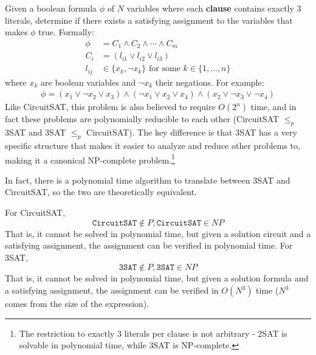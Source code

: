 \documentclass{article}
\begin{document}
    \begin{definition}[3SAT]
      Given a boolean formula $\phi$ of $N$ variables where each \textbf{clause} contains exactly 3 literals, determine if there exists a satisfying assignment to the variables that makes $\phi$ true. Formally:
      \begin{align*}
        \phi &= C_1 \land C_2 \land \cdots \land C_m \\
        C_i &= (l_{i1} \lor l_{i2} \lor l_{i3}) \\
        l_{ij} &\in \{x_k, \neg x_k\} \text{ for some } k \in \{1,\ldots,n\}
      \end{align*}
      where $x_k$ are boolean variables and $\neg x_k$ their negations. For example:
      \begin{align*}
        \phi = (x_1 \lor \neg x_2 \lor x_3) \land (\neg x_1 \lor x_2 \lor x_4) \land (x_2 \lor \neg x_3 \lor \neg x_4)
      \end{align*}
      Like CircuitSAT, this problem is also believed to require $O(2^n)$ time, and in fact these problems are polynomially reducible to each other (CircuitSAT $\leq_p$ 3SAT and 3SAT $\leq_p$ CircuitSAT). The key difference is that 3SAT has a very specific structure that makes it easier to analyze and reduce other problems to, making it a canonical NP-complete problem.\footnote{The restriction to exactly 3 literals per clause is not arbitrary - 2SAT is solvable in polynomial time, while 3SAT is NP-complete.}
    \end{definition}

    In fact, there is a polynomial time algorithm to translate between 3SAT and CircuitSAT, so the two are theoretically equivalent. 

    \begin{theorem}
      For CircuitSAT, 
      \begin{equation}
        \texttt{CircuitSAT} \not\in P, \texttt{CircuitSAT} \in NP
      \end{equation}
      That is, it cannot be solved in polynomial time, but given a solution circuit and a satisfying assignment, the assignment can be verified in polynomial time. 
      For 3SAT, 
      \begin{equation}
        \texttt{3SAT} \not\in P, \texttt{3SAT} \in NP
      \end{equation}
      That is, it cannot be solved in polynomial time, but given a solution formula and a satisfying assignment, the assignment can be verified in $O(N^3)$ time ($N^3$ comes from the size of the expression). 
    \end{theorem}
\end{document}

